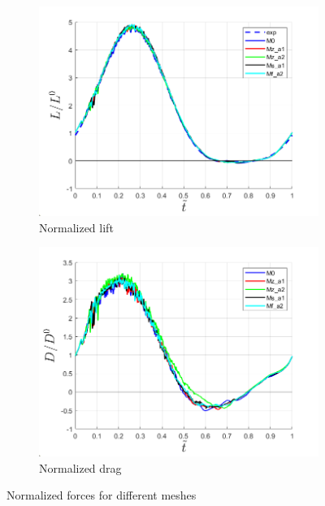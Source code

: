 \begin{figure}[H]
\centering

\begin{subfigure}[b]{0.7\textwidth}
\centering
\includegraphics[width=1\textwidth]{figures/Results/Lift_plot.png}
\caption{Normalized lift}
\label{fig:lift_plot}
\end{subfigure}
\begin{subfigure}[b]{0.7\textwidth}
\centering
\includegraphics[width=1\textwidth]{figures/Results/Drag_plot.png}
\caption{Normalized drag}
\label{fig:drag_plot}
\end{subfigure}

\label{fig:force_response_adapt}
\caption{Normalized forces for different meshes}
\end{figure}

